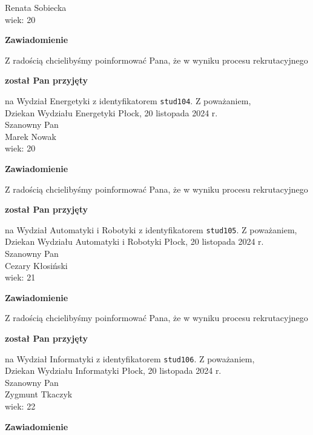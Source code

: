 \documentclass[12pt,a4paper]{article}
\begin{document}
Renata Sobiecka  \\
wiek: 20
\bigskip
\begin{center}
 	{\Large\textbf{Zawiadomienie}}
\end{center}
\bigskip
Z radością chcielibyśmy poinformować Pana, że w wyniku procesu rekrutacyjnego 
\begin{center}
\textsf{\textbf{został Pan przyjęty}} 
\end{center}
na Wydział Energetyki z identyfikatorem \verb|stud104|. 
\vspace{2cm}
\noindent
Z poważaniem,\\
Dziekan
Wydziału Energetyki
\newpage
\hfill Płock, 20 listopada 2024 r.\\
\noindent 
Szanowny Pan \\
Marek Nowak \\
wiek: 20
\bigskip
\begin{center}
 	{\Large\textbf{Zawiadomienie}}
\end{center}
\bigskip
Z radością chcielibyśmy poinformować Pana, że w wyniku procesu rekrutacyjnego 
\begin{center}
\textsf{\textbf{został Pan przyjęty}} 
\end{center}
na Wydział Automatyki i Robotyki z identyfikatorem \verb|stud105|. 
\vspace{2cm}
\noindent
Z poważaniem,\\
Dziekan
Wydziału Automatyki i Robotyki
\newpage
\hfill Płock, 20 listopada 2024 r.\\
\noindent 
Szanowny Pan \\
Cezary Kłosiński \\
wiek: 21
\bigskip
\begin{center}
 	{\Large\textbf{Zawiadomienie}}
\end{center}
\bigskip
Z radością chcielibyśmy poinformować Pana, że w wyniku procesu rekrutacyjnego 
\begin{center}
\textsf{\textbf{został Pan przyjęty}} 
\end{center}
na Wydział Informatyki z identyfikatorem \verb|stud106|. 
\vspace{2cm}
\noindent
Z poważaniem,\\
Dziekan
Wydziału Informatyki
\newpage
\hfill Płock, 20 listopada 2024 r.\\
\noindent 
Szanowny Pan \\
Zygmunt Tkaczyk \\
wiek: 22
\bigskip
\begin{center}
 	{\Large\textbf{Zawiadomienie}}
\end{center}
\end{document}
